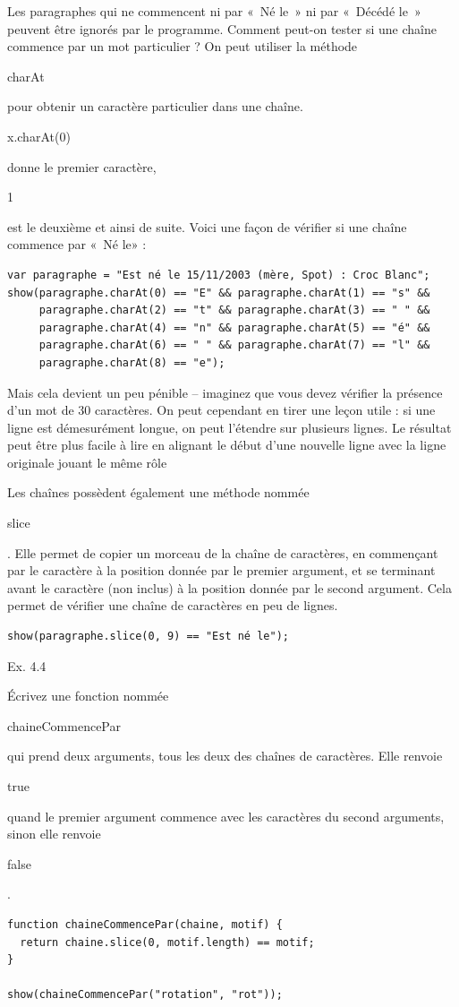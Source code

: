 \documentclass{FramateX}
\renewcommand{\texttt}[1]{\begin{sffamily}{#1}\end{sffamily}}
\begin{document}
Les paragraphes qui ne commencent ni par «~Né le~» ni par «~Décédé le~»
peuvent être ignorés par le programme. Comment peut-on tester si une
chaîne commence par un mot particulier ? On peut utiliser la méthode
\texttt{charAt} pour obtenir un caractère particulier dans une chaîne.
\texttt{x.charAt(0)} donne le premier caractère, \texttt{1} est le
deuxième et ainsi de suite. Voici une façon de vérifier si une chaîne
commence par «~Né le» :

\begin{lstlisting}
var paragraphe = "Est né le 15/11/2003 (mère, Spot) : Croc Blanc";
show(paragraphe.charAt(0) == "E" && paragraphe.charAt(1) == "s" &&
     paragraphe.charAt(2) == "t" && paragraphe.charAt(3) == " " &&
     paragraphe.charAt(4) == "n" && paragraphe.charAt(5) == "é" &&
     paragraphe.charAt(6) == " " && paragraphe.charAt(7) == "l" &&
     paragraphe.charAt(8) == "e");
\end{lstlisting}
Mais cela devient un peu pénible -- imaginez que vous devez vérifier la
présence d'un mot de 30 caractères. On peut cependant en tirer une leçon
utile : si une ligne est démesurément longue, on peut l'étendre sur
plusieurs lignes. Le résultat peut être plus facile à lire en alignant
le début d'une nouvelle ligne avec la ligne originale jouant le même
rôle

Les chaînes possèdent également une méthode nommée \texttt{slice}. Elle
permet de copier un morceau de la chaîne de caractères, en commençant
par le caractère à la position donnée par le premier argument, et se
terminant avant le caractère (non inclus) à la position donnée par le
second argument. Cela permet de vérifier une chaîne de caractères en peu
de lignes.

\begin{lstlisting}
show(paragraphe.slice(0, 9) == "Est né le");
\end{lstlisting}
\begin{center}\end{center}

Ex. 4.4

Écrivez une fonction nommée \texttt{chaineCommencePar} qui prend deux
arguments, tous les deux des chaînes de caractères. Elle renvoie
\texttt{true} quand le premier argument commence avec les caractères du
second arguments, sinon elle renvoie \texttt{false}.

\begin{lstlisting}
function chaineCommencePar(chaine, motif) {
  return chaine.slice(0, motif.length) == motif;
}

show(chaineCommencePar("rotation", "rot"));
\end{lstlisting}
\begin{center}\end{center}
\end{document}
